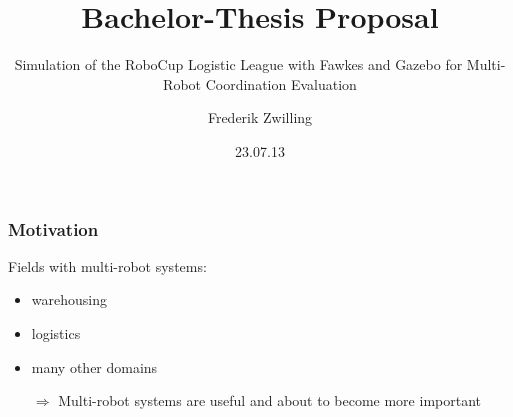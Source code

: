 \documentclass[]{beamer}
\title{Bachelor-Thesis Proposal}
\subtitle{Simulation of the RoboCup Logistic League with Fawkes and Gazebo for Multi-Robot Coordination Evaluation}
\author {Frederik Zwilling}
\institute{RWTH Aachen}
\date{23.07.13}
\begin{document}
\frame{\titlepage}


\begin{frame}
\frametitle{Motivation}
\begin{multicols}{2}
\begin{figure}
\end{figure}
Fields with multi-robot systems:
\begin{itemize}
\item<1-> warehousing
\item<2-> logistics
\item<3-> many other domains
\end{itemize}
\end{multicols}
\pause \pause \pause 
\begin{itemize}
\item[$\Rightarrow$] Multi-robot systems are useful and about to become more important
\end{itemize}
\end{frame}
\end{document}
